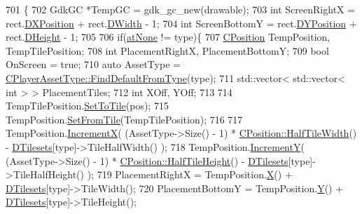 \begin{DoxyCode}
701                                                                                                            
                                                        \{
702     GdkGC *TempGC = gdk\_gc\_new(drawable);
703     \textcolor{keywordtype}{int} ScreenRightX = rect.\hyperlink{structSRectangle_abcbddb03b3ee416cc33109833b5f075c}{DXPosition} + rect.\hyperlink{structSRectangle_a4150898b3f7d90f6e4b0d44bf1ae3bd2}{DWidth} - 1;
704     \textcolor{keywordtype}{int} ScreenBottomY = rect.\hyperlink{structSRectangle_a120aa0a90033bc6e07c36c151a3bbc71}{DYPosition} + rect.\hyperlink{structSRectangle_a84ea3c2314c43cab6186170662188899}{DHeight} - 1;
705 
706     \textcolor{keywordflow}{if}(\hyperlink{GameDataTypes_8h_a5600d4fc433b83300308921974477feca82fb51718e2c00981a2d37bc6fe92593}{atNone} != type)\{
707         \hyperlink{classCPosition}{CPosition} TempPosition, TempTilePosition;
708         \textcolor{keywordtype}{int} PlacementRightX, PlacementBottomY;
709         \textcolor{keywordtype}{bool} OnScreen = \textcolor{keyword}{true};
710         \textcolor{keyword}{auto} AssetType = \hyperlink{classCPlayerAssetType_a7b3c6682f379bfcd974342329eaabab9}{CPlayerAssetType::FindDefaultFromType}(type);
711         std::vector< std::vector< int > > PlacementTiles;
712         \textcolor{keywordtype}{int} XOff, YOff;
713         
714         TempTilePosition.\hyperlink{classCPosition_ae302aa21792de64c97de29e2cbbfeb94}{SetToTile}(pos);
715         TempPosition.\hyperlink{classCPosition_a46994e6a8b8e3b4237edd7259ad844b6}{SetFromTile}(TempTilePosition);
716         
717         TempPosition.\hyperlink{classCPosition_aa5955d67d5ab7ca74d80cb7303b6eaa9}{IncrementX}( (AssetType->Size() - 1) * 
      \hyperlink{classCPosition_a4b799a0fb78ddd8bbd8548980e2458af}{CPosition::HalfTileWidth}() - \hyperlink{classCAssetRenderer_ae8201de704851c1de6424a8da77b785e}{DTilesets}[type]->TileHalfWidth() );
718         TempPosition.\hyperlink{classCPosition_a3f2a26798bb27b1252ff1be303b3adfc}{IncrementY}( (AssetType->Size() - 1) * 
      \hyperlink{classCPosition_a5e371060b1aa0d3d3c5df1e353e0e5fd}{CPosition::HalfTileHeight}() - \hyperlink{classCAssetRenderer_ae8201de704851c1de6424a8da77b785e}{DTilesets}[type]->TileHalfHeight() );
719         PlacementRightX = TempPosition.\hyperlink{classCPosition_a9a6b94d3b91df1492d166d9964c865fc}{X}() + \hyperlink{classCAssetRenderer_ae8201de704851c1de6424a8da77b785e}{DTilesets}[type]->TileWidth();
720         PlacementBottomY = TempPosition.\hyperlink{classCPosition_a1aa8a30e2f08dda1f797736ba8c13a87}{Y}() + \hyperlink{classCAssetRenderer_ae8201de704851c1de6424a8da77b785e}{DTilesets}[type]->TileHeight();

\end{DoxyCode}
